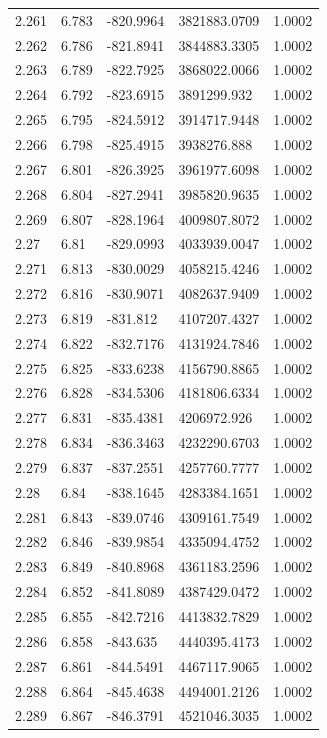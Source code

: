 \begin{tabular}{lllll}
2.261 & 6.783 & -820.9964 & 3821883.0709 & 1.0002 \\
2.262 & 6.786 & -821.8941 & 3844883.3305 & 1.0002 \\
2.263 & 6.789 & -822.7925 & 3868022.0066 & 1.0002 \\
2.264 & 6.792 & -823.6915 & 3891299.932 & 1.0002 \\
2.265 & 6.795 & -824.5912 & 3914717.9448 & 1.0002 \\
2.266 & 6.798 & -825.4915 & 3938276.888 & 1.0002 \\
2.267 & 6.801 & -826.3925 & 3961977.6098 & 1.0002 \\
2.268 & 6.804 & -827.2941 & 3985820.9635 & 1.0002 \\
2.269 & 6.807 & -828.1964 & 4009807.8072 & 1.0002 \\
2.27 & 6.81 & -829.0993 & 4033939.0047 & 1.0002 \\
2.271 & 6.813 & -830.0029 & 4058215.4246 & 1.0002 \\
2.272 & 6.816 & -830.9071 & 4082637.9409 & 1.0002 \\
2.273 & 6.819 & -831.812 & 4107207.4327 & 1.0002 \\
2.274 & 6.822 & -832.7176 & 4131924.7846 & 1.0002 \\
2.275 & 6.825 & -833.6238 & 4156790.8865 & 1.0002 \\
2.276 & 6.828 & -834.5306 & 4181806.6334 & 1.0002 \\
2.277 & 6.831 & -835.4381 & 4206972.926 & 1.0002 \\
2.278 & 6.834 & -836.3463 & 4232290.6703 & 1.0002 \\
2.279 & 6.837 & -837.2551 & 4257760.7777 & 1.0002 \\
2.28 & 6.84 & -838.1645 & 4283384.1651 & 1.0002 \\
2.281 & 6.843 & -839.0746 & 4309161.7549 & 1.0002 \\
2.282 & 6.846 & -839.9854 & 4335094.4752 & 1.0002 \\
2.283 & 6.849 & -840.8968 & 4361183.2596 & 1.0002 \\
2.284 & 6.852 & -841.8089 & 4387429.0472 & 1.0002 \\
2.285 & 6.855 & -842.7216 & 4413832.7829 & 1.0002 \\
2.286 & 6.858 & -843.635 & 4440395.4173 & 1.0002 \\
2.287 & 6.861 & -844.5491 & 4467117.9065 & 1.0002 \\
2.288 & 6.864 & -845.4638 & 4494001.2126 & 1.0002 \\
2.289 & 6.867 & -846.3791 & 4521046.3035 & 1.0002 \\

\end{tabular}
